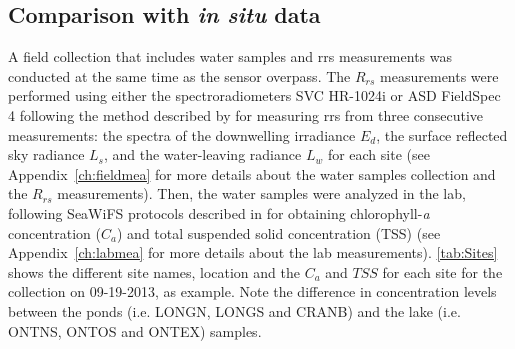 \subsection{Comparison with {\it in situ} data}
A field collection that includes water samples and \gls{rrs} measurements was conducted at the same time as the sensor overpass. The $R_{rs}$ measurements were performed using either the spectroradiometers SVC HR-1024i  \citep{SVCHR1024i} or ASD FieldSpec 4 \citep{ASDManual2012} following the method described by \citet{Mobley:1999} for measuring \gls{rrs} from three consecutive measurements: the spectra of the downwelling irradiance $E_d$, the surface reflected sky radiance $L_s$, and the water-leaving radiance $L_w$ for each site (see Appendix~\ref{ch:fieldmea} for more details about the water samples collection and the $R_{rs}$ measurements). Then, the water samples were analyzed in the lab, following SeaWiFS protocols described in \citet{Mueller1995} for obtaining chlorophyll-{\it a} concentration ($C_a$) and total suspended solid concentration (TSS) (see Appendix~\ref{ch:labmea} for more details about the lab measurements). \autoref{tab:Sites} shows the different site names, location and the $C_a$ and $TSS$ for each site for the collection on 09-19-2013, as example. Note the difference in concentration levels between the ponds (i.e. LONGN, LONGS and CRANB) and the lake (i.e. ONTNS, ONTOS and ONTEX) samples.



